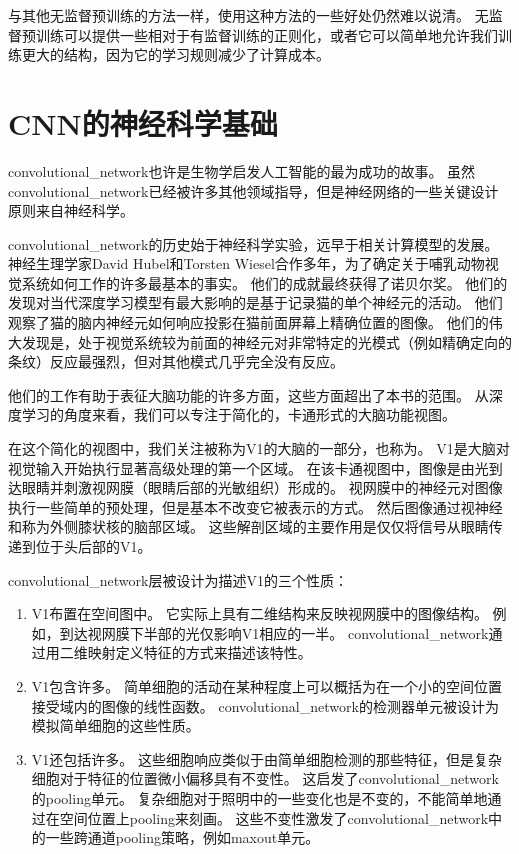  
与其他无监督预训练的方法一样，使用这种方法的一些好处仍然难以说清。
无监督预训练可以提供一些相对于有监督训练的正则化，或者它可以简单地允许我们训练更大的结构，因为它的学习规则减少了计算成本。

\section{\gls{CNN}的神经科学基础}
\label{sec:the_neuroscientific_basis_for_convolutional_networks}

\gls{convolutional_network}也许是生物学启发人工智能的最为成功的故事。
虽然\gls{convolutional_network}已经被许多其他领域指导，但是神经网络的一些关键设计原则来自神经科学。

\gls{convolutional_network}的历史始于神经科学实验，远早于相关计算模型的发展。
神经生理学家David Hubel和Torsten Wiesel合作多年，为了确定关于哺乳动物视觉系统如何工作的许多最基本的事实\citep{Hubel+Wiesel-1959,Hubel62,Hubel+Wiesel-1968}。
他们的成就最终获得了诺贝尔奖。
他们的发现对当代深度学习模型有最大影响的是基于记录猫的单个神经元的活动。
他们观察了猫的脑内神经元如何响应投影在猫前面屏幕上精确位置的图像。
他们的伟大发现是，处于视觉系统较为前面的神经元对非常特定的光模式（例如精确定向的条纹）反应最强烈，但对其他模式几乎完全没有反应。

他们的工作有助于表征大脑功能的许多方面，这些方面超出了本书的范围。
从深度学习的角度来看，我们可以专注于简化的，卡通形式的大脑功能视图。

在这个简化的视图中，我们关注被称为V1的大脑的一部分，也称为。
V1是大脑对视觉输入开始执行显著高级处理的第一个区域。
在该卡通视图中，图像是由光到达眼睛并刺激视网膜（眼睛后部的光敏组织）形成的。
视网膜中的神经元对图像执行一些简单的预处理，但是基本不改变它被表示的方式。
然后图像通过视神经和称为外侧膝状核的脑部区域。 
这些解剖区域的主要作用是仅仅将信号从眼睛传递到位于头后部的V1。
 
 
\gls{convolutional_network}层被设计为描述V1的三个性质：
\begin{enumerate}
  \item V1布置在空间图中。
  它实际上具有二维结构来反映视网膜中的图像结构。
  例如，到达视网膜下半部的光仅影响V1相应的一半。 
  \gls{convolutional_network}通过用二维映射定义特征的方式来描述该特性。

  \item V1包含许多。
  简单细胞的活动在某种程度上可以概括为在一个小的空间位置接受域内的图像的线性函数。
  \gls{convolutional_network}的检测器单元被设计为模拟简单细胞的这些性质。

  \item V1还包括许多。
  这些细胞响应类似于由简单细胞检测的那些特征，但是复杂细胞对于特征的位置微小偏移具有不变性。 
  这启发了\gls{convolutional_network}的\gls{pooling}单元。
  复杂细胞对于照明中的一些变化也是不变的，不能简单地通过在空间位置上\gls{pooling}来刻画。 
  这些不变性激发了\gls{convolutional_network}中的一些跨通道\gls{pooling}策略，例如maxout单元\citep{Goodfellow-et-al-ICML2013}。
\end{enumerate}

